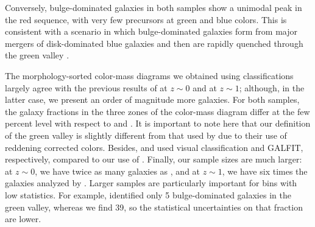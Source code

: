Conversely, bulge-dominated galaxies in both samples show a unimodal peak in the red sequence, with very few precursors at green and blue colors. 
This is consistent with a scenario in which bulge-dominated galaxies form from major mergers of disk-dominated blue galaxies and then are rapidly quenched through the green valley \citep{schawinski_14_green_herring}.

The morphology-sorted color-mass diagrams we obtained using \gamornet{} classifications largely agree with the previous results of \citet{schawinski_14_green_herring} at $z\sim0$ and \citet{powell_17} at $z \sim 1$; although, in the latter case, we present an order of magnitude more galaxies. For both samples, the galaxy fractions in the three zones of the color-mass diagram differ at the few percent level with respect to \citet{schawinski_14_green_herring} and \citet{powell_17}. It is important to note here that our definition of the green valley is slightly different from that used by \citet{schawinski_14_green_herring} due to their use of reddening corrected colors. Besides, \cite{schawinski_14_green_herring} and \cite{powell_17} used visual classification and GALFIT, respectively, compared to our use of \gamornet{}. Finally, our sample sizes are much larger: at $z \sim 0$, we have twice as many galaxies as \citet{schawinski_14_green_herring}, and at $z\sim1$, we have six times the galaxies analyzed by \citet{powell_17}. Larger samples are particularly important for bins with low statistics. For example, \cite{powell_17} identified only 5 bulge-dominated galaxies in the green valley, whereas we find 39, so the statistical uncertainties on that fraction are lower.

